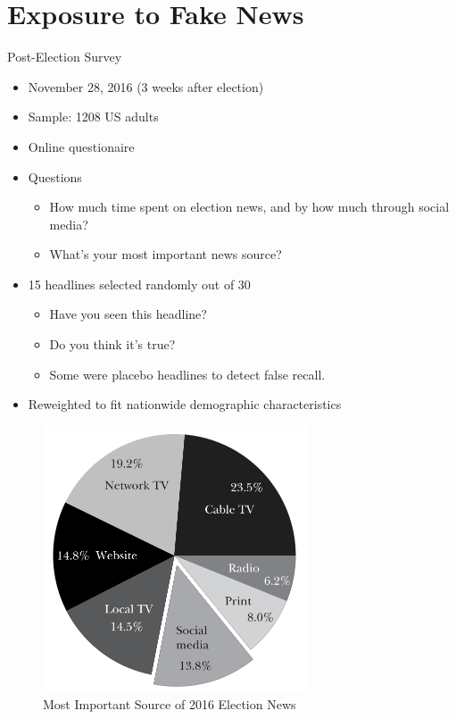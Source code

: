 \documentclass[
  10pt,
  ignorenonframetext,
  aspectratio=43,
]{beamer}
\providecommand{\tightlist}{%
  \setlength{\itemsep}{0pt}\setlength{\parskip}{0pt}}
\begin{document}
\hypertarget{exposure-to-fake-news}{%
\section{Exposure to Fake News}\label{exposure-to-fake-news}}

\begin{frame}{Post-Election Survey}
\protect\hypertarget{post-election-survey}{}
\begin{itemize}
\tightlist
\item
  November 28, 2016 (3 weeks after election)
\item
  Sample: 1208 US adults
\item
  Online questionaire
\item
  Questions

  \begin{itemize}
  \tightlist
  \item
    How much time spent on election news, and by how much through social
    media?
  \item
    What's your most important news source?
  \end{itemize}
\item
  15 headlines selected randomly out of 30

  \begin{itemize}
  \tightlist
  \item
    Have you seen this headline?
  \item
    Do you think it's true?
  \item
    Some were placebo headlines to detect false recall.
  \end{itemize}
\item
  Reweighted to fit nationwide demographic characteristics
\end{itemize}
\end{frame}

\begin{frame}
\begin{figure}
\centering
\includegraphics[width=0.7\textwidth,height=\textheight]{20220315-allcott-gentzkow-2016-election-fake-news.assets/image-20220314204054746.png}
\caption{Most Important Source of 2016 Election News}
\end{figure}
\end{frame}
\end{document}
